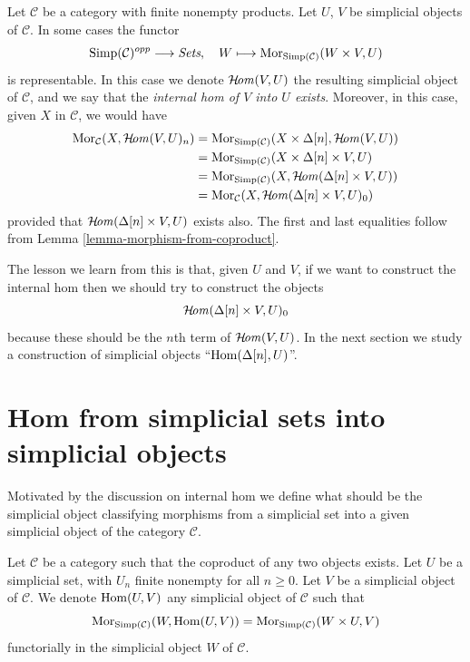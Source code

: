 \noindent
Let $\mathcal{C}$ be a category with finite nonempty
products. Let $U$, $V$ be simplicial objects of $\mathcal{C}$.
In some cases the functor
$$
\text{Simp}(\mathcal{C})^{opp} \longrightarrow \textit{Sets}, \quad
W \longmapsto \mathop{\mathrm{Mor}}\nolimits_{\text{Simp}(\mathcal{C})}(W \times V, U)
$$
is representable. In this case we denote $\mathop{\mathcal{H}\!\mathit{om}}\nolimits(V, U)$
the resulting simplicial object of $\mathcal{C}$, and we say
that the {\it internal hom of $V$ into $U$ exists}. Moreover,
in this case, given $X$ in $\mathcal{C}$, we would have
\begin{align*}
\mathop{\mathrm{Mor}}\nolimits_\mathcal{C}(X, \mathop{\mathcal{H}\!\mathit{om}}\nolimits(V, U)_n)
& =
\mathop{\mathrm{Mor}}\nolimits_{\text{Simp}(\mathcal{C})}(X \times \Delta[n], \mathop{\mathcal{H}\!\mathit{om}}\nolimits(V, U)) \\
& =
\mathop{\mathrm{Mor}}\nolimits_{\text{Simp}(\mathcal{C})}(X \times \Delta[n]\times V, U) \\
& =
\mathop{\mathrm{Mor}}\nolimits_{\text{Simp}(\mathcal{C})}(X, \mathop{\mathcal{H}\!\mathit{om}}\nolimits(\Delta[n] \times V, U)) \\
& =
\mathop{\mathrm{Mor}}\nolimits_\mathcal{C}(X, \mathop{\mathcal{H}\!\mathit{om}}\nolimits(\Delta[n] \times V, U)_0)
\end{align*}
provided that $\mathop{\mathcal{H}\!\mathit{om}}\nolimits(\Delta[n] \times V, U)$
exists also. The first and last equalities follow from
Lemma \ref{lemma-morphism-from-coproduct}.

\medskip\noindent
The lesson we learn from this is that, given $U$ and $V$,
if we want to construct the internal hom then we should try to
construct the objects
$$
\mathop{\mathcal{H}\!\mathit{om}}\nolimits(\Delta[n] \times V, U)_0
$$
because these should be the $n$th term of $\mathop{\mathcal{H}\!\mathit{om}}\nolimits(V, U)$.
In the next section we study a construction of simplicial objects
``$\mathop{\mathrm{Hom}}\nolimits(\Delta[n], U)$''.


\section{Hom from simplicial sets into simplicial objects}
\label{section-hom-from-simplicial-sets}

\noindent
Motivated by the discussion on internal hom we define
what should be the simplicial object classifying
morphisms from a simplicial set into a given
simplicial object of the category $\mathcal{C}$.

\begin{definition}
\label{definition-hom-from-simplicial-set}
Let $\mathcal{C}$ be a category such that the coproduct
of any two objects exists.
Let $U$ be a simplicial set, with $U_n$ finite nonempty
for all $n \geq 0$.
Let $V$ be a simplicial object of $\mathcal{C}$.
We denote {\it $\mathop{\mathrm{Hom}}\nolimits(U, V)$} any simplicial object of
$\mathcal{C}$ such that
$$
\mathop{\mathrm{Mor}}\nolimits_{\text{Simp}(\mathcal{C})}(W, \mathop{\mathrm{Hom}}\nolimits(U, V))
=
\mathop{\mathrm{Mor}}\nolimits_{\text{Simp}(\mathcal{C})}(W \times U, V)
$$
functorially in the simplicial object $W$ of $\mathcal{C}$.
\end{definition}


